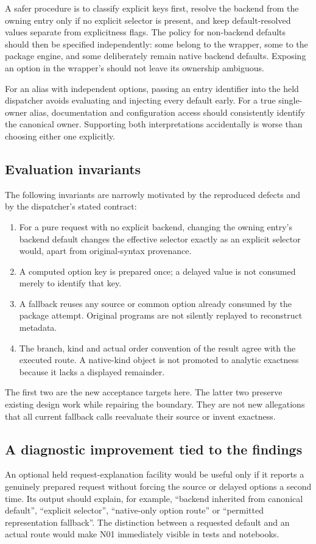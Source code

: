\documentclass[11pt,a4paper]{article}
\newcommand{\code}[1]{\texttt{\detokenize{#1}}}
\begin{document}
A safer procedure is to classify explicit keys first, resolve the backend from the owning entry only if no explicit selector is present, and keep default-resolved values separate from explicitness flags. The policy for non-backend defaults should then be specified independently: some belong to the wrapper, some to the package engine, and some deliberately remain native backend defaults. Exposing an option in the wrapper's \code{Options} should not leave its ownership ambiguous.

For an alias with independent options, passing an entry identifier into the held dispatcher avoids evaluating and injecting every default early. For a true single-owner alias, documentation and configuration access should consistently identify the canonical owner. Supporting both interpretations accidentally is worse than choosing either one explicitly.

\subsection{Evaluation invariants}
The following invariants are narrowly motivated by the reproduced defects and by the dispatcher's stated contract:
\begin{enumerate}
\item For a pure request with no explicit backend, changing the owning entry's backend default changes the effective selector exactly as an explicit selector would, apart from original-syntax provenance.
\item A computed option key is prepared once; a delayed value is not consumed merely to identify that key.
\item A fallback reuses any source or common option already consumed by the package attempt. Original programs are not silently replayed to reconstruct metadata.
\item The branch, kind and actual order convention of the result agree with the executed route. A native-kind object is not promoted to analytic exactness because it lacks a displayed remainder.
\end{enumerate}
The first two are the new acceptance targets here. The latter two preserve existing design work while repairing the boundary. They are not new allegations that all current fallback calls reevaluate their source or invent exactness.

\subsection{A diagnostic improvement tied to the findings}
An optional held request-explanation facility would be useful only if it reports a genuinely prepared request without forcing the source or delayed options a second time. Its output should explain, for example, ``backend inherited from canonical default'', ``explicit selector'', ``native-only option route'' or ``permitted representation fallback''. The distinction between a requested default and an actual route would make N01 immediately visible in tests and notebooks.
\end{document}
